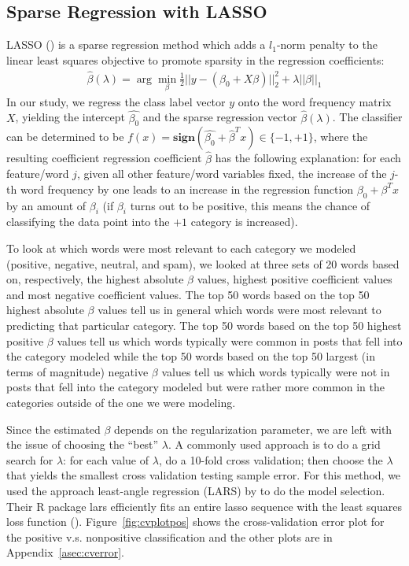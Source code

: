 \documentclass[11pt]{article}
\newcommand{\1}[1]{{\mathbf 1}\left\{#1\right\}}        %
\begin{document}
\subsection{Sparse Regression with LASSO}

LASSO (\cite{tibshirani1996regression}) is a sparse regression method which adds a $l_1$-norm penalty to the linear least squares objective to promote sparsity in the regression coefficients:
\begin{align}
\label{eq:Lasso}
\hat{\beta}(\lambda) = \arg \min_\beta \frac{1}{2}||y-(\beta_0+X\beta)||_2^2 + \lambda ||\beta||_1
\end{align}
In our study, we regress the class label vector $y$ onto the word frequency matrix $X$, yielding the intercept $\hat{\beta_0}$ and the sparse regression vector $\hat{\beta}(\lambda)$. The classifier can be determined to be $f(x) = \textbf{sign}(\hat{\beta_0}+\hat{\beta}^Tx)\in\{-1,+1\}$, where the resulting coefficient regression coefficient $\hat{\beta}$ has the following explanation: for each feature/word $j$, given all other feature/word variables fixed, the increase of the $j$-th word frequency by one leads to an increase in the regression function $\beta_0+\beta^Tx$ by an amount of $\beta_i$ (if $\beta_i$ turns out to be positive, this means the chance of classifying the data point into the $+1$ category is increased).

To look at which words were most relevant to each category we modeled (positive, negative, neutral, and spam), we looked at three sets of 20 words based on, respectively, the highest absolute $\beta$ values, highest positive coefficient values and most negative coefficient values. The top 50 words based on the top 50 highest absolute $\beta$ values tell us in general which words were most relevant to predicting that particular category.  The top 50 words based on the top 50 highest positive $\beta$ values tell us which words typically were common in posts that fell into the category modeled while the top 50 words based on the top 50 largest (in terms of magnitude) negative $\beta$ values tell us which words typically were not in posts that fell into the category modeled but were rather more common in the categories outside of the one we were modeling.

Since the estimated $\beta$ depends on the regularization parameter, we are left with the issue of choosing the ``best'' $\lambda$. A commonly used approach is to do a grid search for $\lambda$: for each value of $\lambda$, do a 10-fold cross validation; then choose the $\lambda$ that yields the smallest cross validation testing sample error. For this method, we used the approach least-angle regression (LARS) by \cite{efron2004least} to do the model selection. Their {\sffamily R} package {\sffamily lars} efficiently fits an entire lasso sequence with the least squares loss function (\cite{Rlars}). Figure~\ref{fig:cvplotpos} shows the cross-validation error plot for the positive v.s. nonpositive classification and the other plots are in Appendix~\ref{asec:cverror}.
\end{document}
